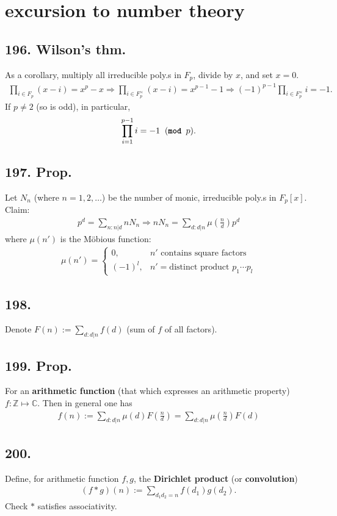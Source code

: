 \documentclass[12pt]{article}
\newcommand\F\frac%
\newcommand\X\times%
\newcommand\Mp\mapsto%
\newcommand{\Ip}{\Rightarrow} %
\newcommand{\Rb}[1]{ \left( #1 \right) }%
\newcommand{\BF}[1]{ \mathbb{#1} }%
\newcommand{\Ss}[1]{\textsf{\bfseries{#1}}}%
\newcommand{\Tw}[1]{\texttt{\bfseries{#1}}}%
\newcommand{\EqGo}[1]{ \begin{gather*}{#1}\end{gather*} } %
\begin{document}
\section{excursion to number theory}
\subsection*{196. Wilson's thm.} As a corollary, multiply all irreducible poly.s in \(F_p\), divide by \(x\), and set \(x=0\). \EqGo{
 \prod_{i \in F_p} (x-i) = x^p -x
 \Ip \prod_{i \in F_p^\X} (x-i) = x^{p-1} -1
 \Ip (-1)^{p-1} \prod_{i \in F_p^\X} i =-1. 
} If \(p \neq 2\) (so is odd), in particular, \EqGo{
  \prod_{i=1}^{p-1} i =-1 \;\;(\Tw{mod } p).
} 

\subsection*{197. Prop.} Let \(N_n\) (where \(n=1,2,\dotsc\)) be the number of monic, irreducible poly.s in \(F_p[x]\). Claim: \EqGo{
 p^d = \sum_{n: n \Big| d} n N_n 
 \Ip n N_n = \sum_{d: d \Big| n} \mu\Rb{\F{n}{d}} p^d
} where \(\mu(n')\) is the M\"obious function: \begin{gather*}
 \mu(n')= \begin{cases}
  0, &n' \textrm{ contains square factors} \\
  (-1)^l, &n' = \textrm{distinct product } p_1 \dotsb p_l
 \end{cases}
\end{gather*}

\subsection*{198.} Denote \(F(n) := \sum_{d:d|n} f(d)\) (sum of \(f\) of all factors).

\subsection*{199. Prop.} For an \Ss{arithmetic function} (that which expresses an arithmetic property) \(f: \BF{Z} \Mp \BF{C}\). 
Then in general one has \EqGo{
 f(n) := \sum_{d:d|n} \mu(d) F\Rb{\F{n}{d}}
 = \sum_{d:d|n} \mu\Rb{\F{n}{d}} F(d) 
}

\subsection*{200.} Define, for arithmetic function \(f,g\), the \Ss{Dirichlet product} (or \Ss{convolution}) \EqGo{
 (f*g)(n) := \sum_{d_1 d_2 =n} f(d_1)g(d_2).
} \indent Check \(*\) satisfies associativity. 
\end{document}
